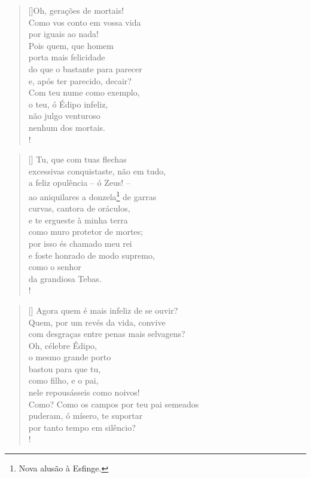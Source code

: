 \settowidth{\versewidth}{do que o bastante para parecerxx}
\begin{verse}[\versewidth]Oh, gerações de mortais!\\ 
Como vos conto em vossa vida\\
por iguais ao nada!\\
Pois quem, que homem\\
porta mais felicidade\\
do que o bastante para parecer\\
e, após ter parecido, decair?\\
Com teu nume como exemplo,\\
o teu, ó Édipo infeliz,\\
não julgo venturoso\\
nenhum dos mortais.\\!
\end{verse} 
\settowidth{\versewidth}{e foste honrado de modo supremo,xx}
\begin{verse}[\versewidth] 
Tu, que com tuas flechas\\ 
excessivas conquistaste, não em tudo,\\
a feliz opulência -- ó Zeus! --\\
ao aniquilares a donzela\footnote{Nova alusão à Esfinge.} de garras\\
curvas, cantora de oráculos,\\
e te ergueste à minha terra\\
como muro protetor de mortes;\\
por isso és chamado meu rei\\
e foste honrado de modo supremo,\\
como o senhor\\
da grandiosa Tebas.\\!
\end{verse} 
\settowidth{\versewidth}{Como? Como os campos por teu pai semeadosxx}
\begin{verse}[\versewidth] 
Agora quem é mais infeliz de se ouvir?\\ 
Quem, por um revés da vida, convive\\
com desgraças entre penas mais selvagens?\\
Oh, célebre Édipo,\\
o mesmo grande porto\\
bastou para que tu,\\
como filho, e o pai,\\
nele repousásseis como noivos!\\
Como? Como os campos por teu pai semeados\\
puderam, ó mísero, te suportar\\
por tanto tempo em silêncio?\\!
\end{verse} 
